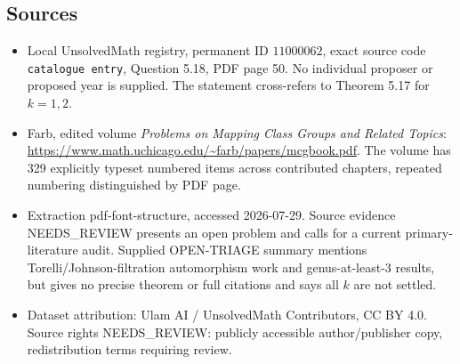 \documentclass[11pt]{article}
\begin{document}
\subsection{Sources}
\begin{itemize}
\item Local UnsolvedMath registry, permanent ID \(11000062\), exact source code \texttt{catalogue entry}, Question 5.18, PDF page 50. No individual proposer or proposed year is supplied. The statement cross-refers to Theorem 5.17 for \(k=1,2\).
\item Farb, edited volume \emph{Problems on Mapping Class Groups and Related Topics}: \url{https://www.math.uchicago.edu/~farb/papers/mcgbook.pdf}. The volume has 329 explicitly typeset numbered items across contributed chapters, repeated numbering distinguished by PDF page.
\item Extraction pdf-font-structure, accessed 2026-07-29. Source evidence NEEDS\_REVIEW presents an open problem and calls for a current primary-literature audit. Supplied OPEN-TRIAGE summary mentions Torelli/Johnson-filtration automorphism work and genus-at-least-3 results, but gives no precise theorem or full citations and says all \(k\) are not settled.
\item Dataset attribution: Ulam AI / UnsolvedMath Contributors, CC BY 4.0. Source rights NEEDS\_REVIEW: publicly accessible author/publisher copy, redistribution terms requiring review.
\end{itemize}
\end{document}
